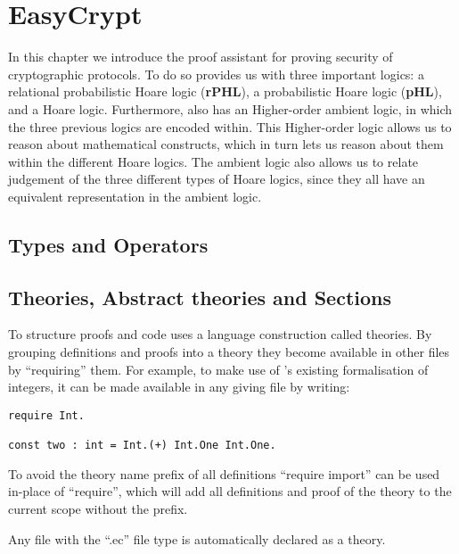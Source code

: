 \chapter{EasyCrypt}
\label{ch:EasyCrypt}

In this chapter we introduce the \easycrypt proof assistant for proving security
of cryptographic protocols.
To do so \easycrypt provides us with three important logics: a relational probabilistic
Hoare logic (\textbf{rPHL}), a probabilistic Hoare logic (\textbf{pHL}), and a
Hoare logic.
Furthermore, \easycrypt also has an Higher-order ambient logic, in which the three
previous logics are encoded within. This Higher-order logic allows us to reason
about mathematical constructs, which in turn lets us reason about them within
the different Hoare logics. The ambient logic also allows us to relate
judgement of the three different types of Hoare logics, since they all have an
equivalent representation in the ambient logic.

\section{Types and Operators}
\label{sec:ec_types_and_operators}

\section{Theories, Abstract theories and Sections}
\label{sec:ec_theories}
To structure proofs and code \easycrypt uses a language construction called
theories. By grouping definitions and proofs into a theory they become available
in other files by ``requiring'' them. For example, to make use of \easycrypt's
existing formalisation of integers, it can be made available in any giving file
by writing:

\begin{lstlisting}[float,label=lst:theory_require,caption=\easycrypt theories: importing definitions]
require Int.

const two : int = Int.(+) Int.One Int.One.
\end{lstlisting}

To avoid the theory name prefix of all definitions ``require import'' can be
used in-place of ``require'', which will add all definitions and proof of the
theory to the current scope without the prefix.

Any \easycrypt file with the ``.ec'' file type is automatically declared as a
theory.

